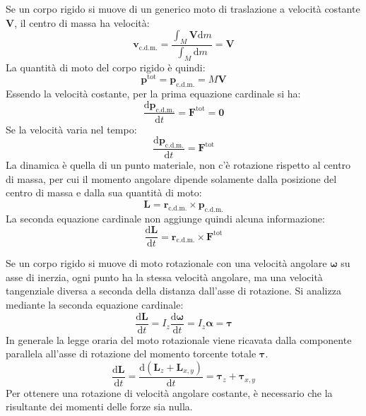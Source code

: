 \documentclass{article}
\newcommand{\vect}[1]{\boldsymbol{\mathbf{#1}}}
\newcommand{\df}{\mathrm{d}}
\numberwithin{equation}{subsection}
\begin{document}
Se un corpo rigido si muove di un generico moto di traslazione a velocità costante $\vect{V}$, 
il centro di massa ha velocità: 
\begin{equation*}
    \vect{v}_{\mathrm{c.d.m.}}=\displaystyle\frac{\int_M\vect{V}\df m}{\int_M \df m}=\vect{V}
\end{equation*}    
La quantità di moto del corpo rigido è quindi: 
\begin{equation*}
    \vect{p}^\mathrm{tot}=\vect{p}_{\mathrm{c.d.m.}}=M\vect{V}
\end{equation*}
Essendo la velocità costante, per la prima equazione cardinale si ha:
\begin{equation*}
    \displaystyle\frac{\df\vect{p}_{\mathrm{c.d.m.}}}{\df t}=\vect{F}^\mathrm{tot}=\vect0
\end{equation*}
Se la velocità varia nel tempo:
\begin{equation*}
    \displaystyle\frac{\df\vect{p}_{\mathrm{c.d.m.}}}{\df t}=\vect{F}^\mathrm{tot}
\end{equation*}
La dinamica è quella di un punto materiale, non c'è rotazione rispetto al centro di massa, per cui il 
momento angolare dipende solamente dalla posizione del centro di massa e dalla sua quantità di moto:
\begin{equation*}
    \vect L=\vect{r}_{\mathrm{c.d.m.}}\times\vect{p}_{\mathrm{c.d.m.}}
\end{equation*}    
La seconda 
equazione cardinale non aggiunge quindi alcuna informazione: 
\begin{equation*}
    \displaystyle\frac{\df\vect{L}}{\df t}=\vect{r}_{\mathrm{c.d.m.}}\times\vect{F}^\mathrm{tot}
\end{equation*}


Se un corpo rigido si muove di moto rotazionale con una velocità 
angolare $\vect{\omega}$ su asse di inerzia, ogni punto ha la stessa velocità angolare, ma una velocità tangenziale diversa a seconda della distanza 
dall'asse di rotazione. Si analizza mediante la seconda equazione cardinale:
\begin{equation}
    \displaystyle\frac{\df\vect{L}}{\df t}=I_z\frac{\df\vect\omega}{\df t}=I_z\vect\alpha=\vect{\tau}
\end{equation}
In generale la legge oraria del moto rotazionale viene ricavata dalla componente parallela all'asse di rotazione del momento torcente totale $\vect{\tau}$. 
\begin{equation*}
    \displaystyle\frac{\df\vect{L}}{\df t}=\frac{\df(\vect{L}_z+\vect{L}_{x,y})}{\df t}=\vect{\tau}_z+\vect{\tau}_{x,y}
\end{equation*}
Per ottenere una rotazione di velocità angolare costante, è necessario che la risultante dei momenti delle forze sia nulla. 
\end{document}
